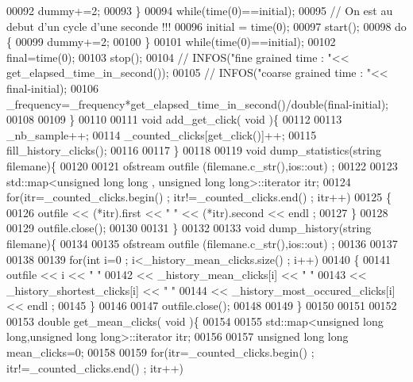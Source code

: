 \begin{DoxyCode}
00092       dummy+=2;
00093     \}
00094     \textcolor{keywordflow}{while}(time(0)==initial);
00095     \textcolor{comment}{// On est au debut d'un cycle d'une seconde !!!}
00096     initial = time(0);
00097     start();
00098     \textcolor{keywordflow}{do} \{
00099       dummy+=2;
00100     \}
00101     \textcolor{keywordflow}{while}(time(0)==initial);
00102     \textcolor{keyword}{final}=time(0);
00103     stop();
00104     \textcolor{comment}{//    INFOS("fine grained time : "<<  get\_elapsed\_time\_in\_second());}
00105     \textcolor{comment}{//  INFOS("coarse grained time : "<<  final-initial);}
00106     \_frequency=\_frequency*get\_elapsed\_time\_in\_second()/double(\textcolor{keyword}{final}-initial);
00108 
00109   \}
00110 
00111   \textcolor{keywordtype}{void}  add\_get\_click( \textcolor{keywordtype}{void} )\{
00112        
00113     \_nb\_sample++;
00114     \_counted\_clicks[get\_click()]++;
00115     fill\_history\_clicks();
00116 
00117   \}    
00118 
00119   \textcolor{keywordtype}{void} dump\_statistics(\textcolor{keywordtype}{string} filemane)\{
00120     
00121     ofstream outfile (filemane.c\_str(),ios::out) ;
00122 
00123     std::map<unsigned long long , unsigned long long>::iterator itr;
00124     \textcolor{keywordflow}{for}(itr=\_counted\_clicks.begin() ; itr!=\_counted\_clicks.end()  ; itr++)
00125       \{      
00126       outfile  << (*itr).first << \textcolor{stringliteral}{"  "} << (*itr).second << endl ;       
00127       \}      
00128     
00129     outfile.close();
00130 
00131   \}
00132 
00133   \textcolor{keywordtype}{void} dump\_history(\textcolor{keywordtype}{string} filemane)\{
00134     
00135     ofstream outfile (filemane.c\_str(),ios::out) ;
00136 
00137 
00138 
00139     \textcolor{keywordflow}{for}(\textcolor{keywordtype}{int} i=0 ; i<\_history\_mean\_clicks.size() ; i++)
00140       \{      
00141     outfile  << i << \textcolor{stringliteral}{" "} 
00142          << \_history\_mean\_clicks[i] << \textcolor{stringliteral}{" "} 
00143          << \_history\_shortest\_clicks[i] << \textcolor{stringliteral}{" "} 
00144          << \_history\_most\_occured\_clicks[i] << endl ;
00145       \}      
00146     
00147     outfile.close();
00148 
00149   \}
00150      
00151 
00152 
00153   \textcolor{keywordtype}{double} get\_mean\_clicks( \textcolor{keywordtype}{void} )\{
00154     
00155     std::map<unsigned long long,unsigned long long>::iterator itr;
00156     
00157     \textcolor{keywordtype}{unsigned} \textcolor{keywordtype}{long} \textcolor{keywordtype}{long} mean\_clicks=0;
00158 
00159     \textcolor{keywordflow}{for}(itr=\_counted\_clicks.begin() ; itr!=\_counted\_clicks.end()  ; itr++)

\end{DoxyCode}
